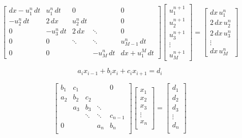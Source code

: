 \begin{equation}
\left[{\begin{matrix}
{dx- u_{1}^{n}\, dt}&{ u_{1}^{n} \, dt}&{0}&{}&{0}\\[5pt]
{-u_{2}^{n} \, dt}&{ 2 \, dx}&{ u_{2}^{n} \, dt}&{}&{0}\\[5pt]
{0}&{-u_{3}^{n} \, dt}&{ 2 \, dx}&\ddots &{0}\\[5pt]
{0}&{0}&\ddots &\ddots &{ u_{M-1}^{n} \, dt}\\[5pt]
{0}&{0}&{}&{-u_{M}^{n} \, dt}&{dx + u_{1}^{M}\, dt}
\end{matrix}}
\right]\left[{\begin{matrix}
{ u_{1}^{n+1}}\\[5pt]
{ u_{2}^{n+1}}\\[5pt]
{ u_{3}^{n+1}}\\[5pt]
\vdots \\[5pt]
{ u_{M}^{n+1}}
\end{matrix}}\right]
=\left[{\begin{matrix}
{dx \, u_{1}^{n}}\\[5pt]
{ 2 \, dx \, u_{2}^{n}}\\[5pt]
{ 2 \, dx \, u_{3}^{n}}\\[5pt]
\vdots \\[5pt]
{dx \, u_{M}^{n}}
\end{matrix}}\right]
  \end{equation}

  \begin{equation}
    a_{i}x_{{i-1}}+b_{i}x_{i}+c_{i}x_{{i+1}}=d_{i}
  \end{equation}


  \begin{equation}
    \begin{bmatrix}{b_{1}}&{c_{1}}&{}&{}&{0}\\
      {a_{2}}&{b_{2}}&{c_{2}}&{}&{}\\
      {}&{a_{3}}&{b_{3}}&\ddots &{}\\
      {}&{}&\ddots &\ddots &{c_{n-1}}\\
      {0}&{}&{}&{a_{n}}&{b_{n}}\\
      \end{bmatrix}
      \begin{bmatrix}{x_{1}}\\
      {x_{2}}\\{x_{3}}\\\vdots \\
      {x_{n}}\\
      \end{bmatrix}
      =
      \begin{bmatrix}{d_{1}}\\
      {d_{2}}\\{d_{3}}\\
      \vdots \\{d_{n}}\\
    \end{bmatrix}
  \end{equation}

